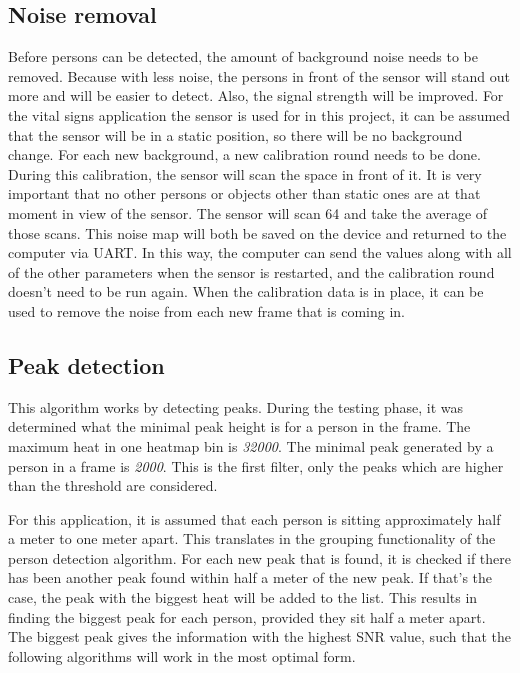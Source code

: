 \subsection{Noise removal}
Before persons can be detected, the amount of background noise needs to be removed. Because with less noise, the persons in front of the sensor will stand out more and will be easier to detect. Also, the signal strength will be improved. For the vital signs application the sensor is used for in this project, it can be assumed that the sensor will be in a static position, so there will be no background change. For each new background, a new calibration round needs to be done. During this calibration, the sensor will scan the space in front of it. It is very important that no other persons or objects other than static ones are at that moment in view of the sensor. The sensor will scan 64 and take the average of those scans. This noise map will both be saved on the device and returned to the computer via UART. In this way, the computer can send the values along with all of the other parameters when the sensor is restarted, and the calibration round doesn't need to be run again. When the calibration data is in place, it can be used to remove the noise from each new frame that is coming in.


\subsection{Peak detection}
This algorithm works by detecting peaks. During the testing phase, it was determined what the minimal peak height is for a person in the frame. The maximum heat in one heatmap bin is \emph{32000}. The minimal peak generated by a person in a frame is \emph{2000}. This is the first filter, only the peaks which are higher than the threshold are considered. 

For this application, it is assumed that each person is sitting approximately half a meter to one meter apart. This translates in the grouping functionality of the person detection algorithm. For each new peak that is found, it is checked if there has been another peak found within half a meter of the new peak. If that's the case, the peak with the biggest heat will be added to the list. This results in finding the biggest peak for each person, provided they sit half a meter apart. The biggest peak gives the information with the highest SNR value, such that the following algorithms will work in the most optimal form.

